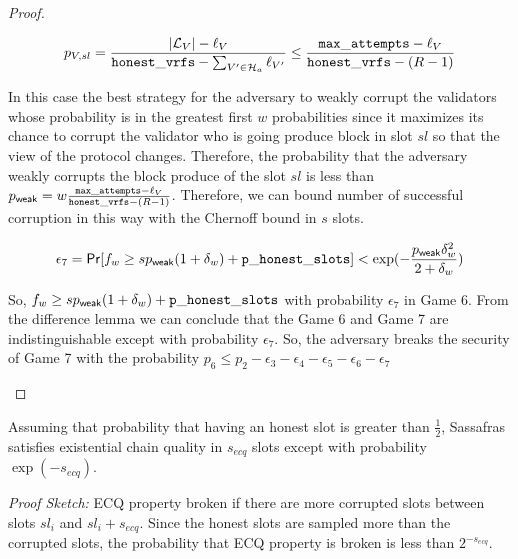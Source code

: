\begin{proof}
\begin{enumerate}[label={{Game }}{{\arabic*}}]
	 \begin{equation}\label{eq:prVs}
	 	p_{V,sl} = \frac{|\mathcal{L}_V|- \ell_V}{\mathtt{honest\_vrfs} - \sum_{V' \in \mathcal{H}_a}\ell_{V'}}\leq \frac{\mathtt{max\_attempts} - \ell_V}{\mathtt{honest\_vrfs} - (R-1)}
	 \end{equation}

	 
	 In this case the best strategy for the adversary to weakly corrupt the validators whose probability is in the greatest first $ w $ probabilities since it maximizes its chance to corrupt the validator who is going produce block in slot $ sl $ so that the view of the protocol changes. Therefore, the probability that the adversary weakly corrupts the block produce of the slot $ sl  $ is less than $p_{\mathsf{weak}} = w \frac{\mathtt{max\_attempts} - \ell_V}{\mathtt{honest\_vrfs} - (R-1)} $. Therefore, we can bound  number of successful corruption in this way with the Chernoff bound in $ s $  slots.
	 
	 \begin{equation}
	 \epsilon_7 = \mathsf{Pr}[f_w \geq sp_{\mathsf{weak}}(1+\delta_w) + \mathtt{p\_honest\_slots}] < \exp(-\frac{p_{\mathsf{weak}}\delta_w^2}{2 + \delta_w})
	 \end{equation}
	 
	So, $ f_w \geq  s p_{\mathsf{weak}}(1+\delta_w) + \mathtt{p\_honest\_slots} $ with probability $ \epsilon_7 $ in Game 6. From the difference lemma we can conclude that the Game 6 and Game 7 are indistinguishable except with probability $ \epsilon_7 $. So, the adversary breaks the security of Game 7 with the probability $ p_6 \leq p_2 - \epsilon_3  - \epsilon_4 - \epsilon_5 - \epsilon_6 -\epsilon_7 $   
	

\end{enumerate}	
\end{proof}

\begin{lemma}[ECQ]
	Assuming that probability that having an honest slot is greater than $ \frac{1}{2} $, Sassafras satisfies existential chain quality in $ s_{ecq} $ slots except with probability $ \exp(-s_{ecq}) $.
\end{lemma}

\emph{Proof Sketch:}
	ECQ property broken if there are more corrupted slots between slots $ sl_i $ and $ sl_i + s_{ecq} $.  Since the honest slots are sampled more than the corrupted slots,  the probability that ECQ property is broken is less than $ 2^{-s_{ecq}} $.
	
